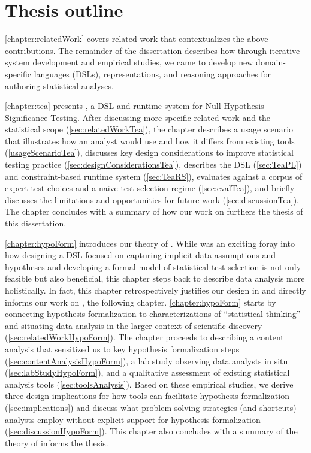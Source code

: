 
\section{Thesis outline}
\autoref{chapter:relatedWork} covers related work that contextualizes the above
contributions. The remainder of the dissertation describes how through iterative
system development and empirical studies, we came to develop new domain-specific
languages (DSLs), representations, and reasoning approaches for authoring
statistical analyses.

\autoref{chapter:tea} presents \tea, a DSL and runtime system for Null
Hypothesis Significance Testing. After discussing more specific related work and
the statistical scope (\autoref{sec:relatedWorkTea}), the chapter describes a
usage scenario that illustrates how an analyst would use \tea and how it differs
from existing tools (\autoref{usageScenarioTea}), discusses key design
considerations to improve statistical testing practice
(\autoref{sec:designConsiderationsTea}), describes the DSL (\autoref{sec:TeaPL})
and constraint-based runtime system (\autoref{sec:TeaRS}), evaluates \tea
against a corpus of expert test choices and a naive test selection regime
(\autoref{sec:evalTea}), and briefly discusses the limitations and opportunities
for future work (\autoref{sec:discussionTea}). The chapter concludes with a
summary of how our work on \tea furthers the thesis of this dissertation. 

\autoref{chapter:hypoForm} introduces our theory of \hypoForm. While \tea was an
exciting foray into how designing a DSL focused on capturing implicit data
assumptions and hypotheses and developing a formal model of statistical test
selection is not only feasible but also beneficial, this chapter steps back to
describe data analysis more holistically. In fact, this chapter retrospectively
justifies our design in \tea and directly informs our work on \tisane, the
following chapter. \autoref{chapter:hypoForm} starts by connecting hypothesis
formalization to characterizations of ``statistical thinking'' and situating
data analysis in the larger context of scientific discovery
(\autoref{sec:relatedWorkHypoForm}). The chapter proceeds to describing a
content analysis that sensitized us to key hypothesis formalization steps
(\autoref{sec:contentAnalysisHypoForm}), a lab study observing data analysts in
situ (\autoref{sec:labStudyHypoForm}), and a qualitative assessment of existing
statistical analysis tools (\autoref{sec:toolsAnalysis}). Based on these
empirical studies, we derive three design implications for how tools can
facilitate hypothesis formalization (\autoref{sec:implications}) and discuss
what problem solving strategies (and shortcuts) analysts employ without explicit
support for hypothesis formalization (\autoref{sec:discussionHypoForm}). This
chapter also concludes with a summary of the theory of \hypoForm informs the
thesis. 

